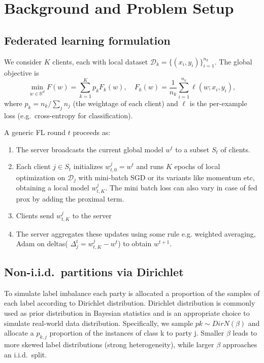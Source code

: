 \documentclass[10pt,twocolumn,letterpaper]{article}
\begin{document}
    \section{Background and Problem Setup}
    \label{sec:background}

    \subsection{Federated learning formulation}

    We consider $K$ clients, each with local dataset
    $\mathcal{D}_k = \{(x_i,y_i)\}_{i=1}^{n_k}$.
    The global objective is
    \begin{equation}
        \min_{w \in \mathbb{R}^d}
        F(w) = \sum_{k=1}^{K} p_k F_k(w),
        \quad
        F_k(w) = \frac{1}{n_k} \sum_{i=1}^{n_k} \ell(w;x_i,y_i),
    \end{equation}
    where $p_k = n_k / \sum_j n_j$ (the weightage of each client) and $\ell$ is the per-example loss
    (e.g.\ cross-entropy for classification).

    A generic FL round $t$ proceeds as:
    \begin{enumerate}
        \item The server broadcasts the current global model $w^t$ to a
        subset $S_t$ of clients.
        \item Each client $j \in S_t$ initializes $w_{t,0}^{j} = w^t$ and runs
        $K$ epochs of local optimization on $\mathcal{D}_j$ with mini-batch SGD or its variants like momentum etc, obtaining a local model $w_{t,K}^{j}$. The mini batch loss can also vary in case of fed prox by adding the proximal term.
        \item Clients send $w_{t,K}^{j}$ to the server
        \item The server aggregates these updates using some rule e.g.
        weighted averaging, Adam on deltas( $\Delta_j^t = w_{t,K}^{j} - w^t$) to obtain $w^{t+1}$.
    \end{enumerate}

    \subsection{Non-i.i.d.\ partitions via Dirichlet}
    \label{sec:dirichlet}

To simulate label imbalance each party is allocated a proportion of the samples of each label according to Dirichlet distribution. Dirichlet distribution is commonly used as prior distribution in Bayesian statistics and is an appropriate choice to simulate real-world data distribution. Specifically, we sample $pk\sim DirN(\beta)$ and allocate a $p_{k,j}$ proportion of the instances of class k to party j. Smaller $\beta$ leads to more skewed label distributions (strong heterogeneity), while larger $\beta$ approaches an i.i.d.\ split.
\end{document}
